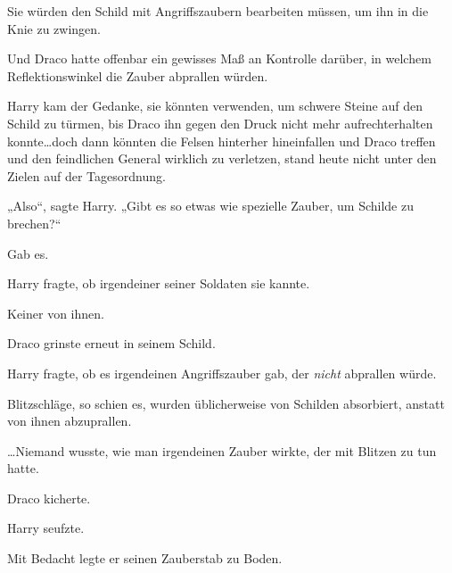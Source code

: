 Sie würden den Schild mit Angriffszaubern bearbeiten müssen, um ihn in die Knie zu zwingen.

Und Draco hatte offenbar ein gewisses Maß an Kontrolle darüber, in welchem Reflektionswinkel die Zauber abprallen würden.

Harry kam der Gedanke, sie könnten  verwenden, um schwere Steine auf den Schild zu türmen, bis Draco ihn gegen den Druck nicht mehr aufrechterhalten konnte…doch dann könnten die Felsen hinterher hineinfallen und Draco treffen und den feindlichen General wirklich zu verletzen, stand heute nicht unter den Zielen auf der Tagesordnung.

„Also“, sagte Harry. „Gibt es so etwas wie spezielle Zauber, um Schilde zu brechen?“

Gab es.

Harry fragte, ob irgendeiner seiner Soldaten sie kannte.

Keiner von ihnen.

Draco grinste erneut in seinem Schild.

Harry fragte, ob es irgendeinen Angriffszauber gab, der \emph{nicht} abprallen würde.

Blitzschläge, so schien es, wurden üblicherweise von Schilden absorbiert, anstatt von ihnen abzuprallen.

…Niemand wusste, wie man irgendeinen Zauber wirkte, der mit Blitzen zu tun hatte.

Draco kicherte.

Harry seufzte.

Mit Bedacht legte er seinen Zauberstab zu Boden.

